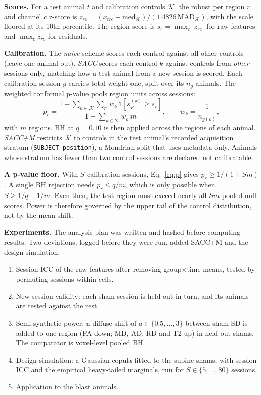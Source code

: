 \documentclass{article}
\begin{document}
\textbf{Scores.} For a test animal $t$ and calibration controls $\mathcal{K}$, the robust per region $r$ and channel $c$ z-score is $z_{rc}=(x_{trc}-\mathrm{med}_\mathcal{K})/(1.4826\,\mathrm{MAD}_\mathcal{K})$, with the scale floored at its 10th percentile. The region score is $s_r=\max_c |z_{rc}|$ for raw features and $\max_c z_{rc}$ for residuals.

\textbf{Calibration.} The \emph{naive} scheme scores each control against all other controls (leave-one-animal-out). \emph{SACC} scores each control $k$ against controls from \emph{other} sessions only, matching how a test animal from a new session is scored. Each calibration session $g$ carries total weight one, split over its $n_g$ animals. The weighted conformal p-value pools region units across sessions:
\begin{equation}
p_r=\frac{1+\sum_{k\in\mathcal{K}}\sum_{r'} w_k\,\mathbb{1}[s^{(k)}_{r'}\geq s_r]}{1+\sum_{k\in\mathcal{K}} w_k\,m},\qquad w_k=\frac{1}{n_{g(k)}},
\label{eq:p}
\end{equation}
with $m$ regions. BH at $q=0.10$ is then applied across the regions of each animal. \emph{SACC+M} restricts $\mathcal{K}$ to controls in the test animal's recorded acquisition stratum (\texttt{SUBJECT\_position}), a Mondrian split that uses metadata only. Animals whose stratum has fewer than two control sessions are declared not calibratable.

\textbf{A p-value floor.} With $S$ calibration sessions, Eq.~\eqref{eq:p} gives $p_r\geq 1/(1+Sm)$. A single BH rejection needs $p_r\leq q/m$, which is only possible when $S\geq 1/q-1/m$. Even then, the test region must exceed nearly all $Sm$ pooled null scores. Power is therefore governed by the upper tail of the control distribution, not by the mean shift.

\textbf{Experiments.} The analysis plan was written and hashed before computing results. Two deviations, logged before they were run, added SACC+M and the design simulation.
\begin{enumerate}
\item Session ICC of the raw features after removing group$\times$time means, tested by permuting sessions within cells.
\item New-session validity: each sham session is held out in turn, and its animals are tested against the rest.
\item Semi-synthetic power: a diffuse shift of $a\in\{0.5,\dots,3\}$ between-sham SD is added to one region (FA down; MD, AD, RD and T2 up) in held-out shams. The comparator is voxel-level pooled BH.
\item Design simulation: a Gaussian copula fitted to the supine shams, with session ICC \ICC{} and the empirical heavy-tailed marginals, run for $S\in\{5,\dots,80\}$ sessions.
\item Application to the blast animals.
\end{enumerate}
\end{document}
